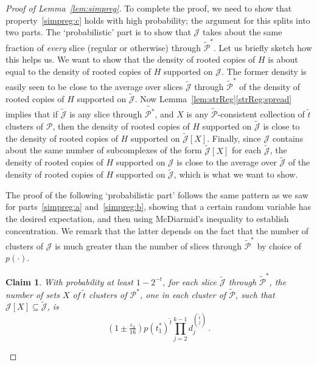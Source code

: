 \documentclass[12pt,a4paper]{amsart}
\let\eps\varepsilon
\newtheorem{claim}[theorem] {Claim}
\newcommand{\cJ}{\mathcal{J}}
\newcommand{\Part}{\mathcal{P}}
\begin{document}
\begin{proof}[Proof of Lemma~\ref{lem:simpreg}]
\smallskip

To complete the proof, we need to show that property~\ref{simpreg:c} holds with high
probability; the argument for this splits into two parts. The `probabilistic' part is to show that $\cJ$ takes about
the same fraction of \emph{every} slice (regular or otherwise) through
$\tilde{\Part}^*$. Let us briefly sketch how this helps us. We want to show that the density of rooted copies of $H$ is about equal to the density of rooted copies of $H$ supported on $\cJ$. The former density is easily seen to be close to the average over slices $\tilde{\cJ}$ through $\tilde{\Part}^*$ of the density of rooted copies of $H$ supported on $\tilde{\cJ}$. Now Lemma~\ref{lem:strReg}\ref{strReg:spread} implies that if $\tilde{\cJ}$ is any slice through $\tilde{\Part^*}$, and $X$ is any $\tilde{\Part}$-consistent collection of $\tilde{t}$ clusters of $\Part$, then the density of rooted copies of $H$ supported on $\tilde{\cJ}$ is close to the density of rooted copies of $H$ supported on $\tilde{\cJ}[X]$. Finally, since $\cJ$ contains about the same number of subcomplexes of the form $\tilde{\cJ}[X]$ for each $\tilde{\cJ}$, the density of rooted copies of $H$ supported on $\cJ$ is close to the average over $\tilde{\cJ}$ of the density of rooted copies of $H$ supported on $\tilde{\cJ}$, which is what we want to show.

The proof of the following `probabilistic part' follows the same pattern as we saw for parts~\ref{simpreg:a} and~\ref{simpreg:b}, showing that a certain random variable has the desired expectation, and then using McDiarmid's inequality to establish concentration. We remark that the latter depends on the fact that the number of clusters of $\cJ$ is much greater than the number of slices through $\tilde{\Part}^*$ by choice of $p(\cdot)$.

\begin{claim}\label{clm:equalchoose}
  With probability at least $1-2^{-t}$, for each slice $\tilde{\cJ}$ through
  $\tilde{\Part}^*$, the number of sets $X$ of $\tilde{t}$ clusters of $\Part^*$, one
  in each cluster of $\tilde{\Part}$, such that $\cJ[X]\subseteq\tilde{\cJ}$, is
  \begin{equation}\label{equalchoose}(1\pm\tfrac{\eps_k}{16})p(t_1^*)^{\tilde{t}}\prod_{j=2}^{k-1}d_j^{\binom{\tilde{t}}{j}}
  \,.
  \end{equation}
\end{claim}


\end{proof}
\end{document}
